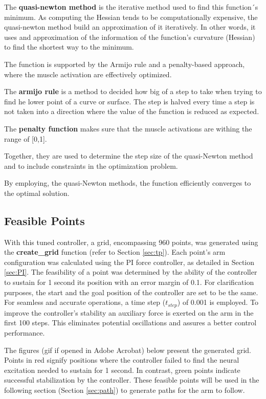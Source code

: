 The \textbf{quasi-newton method} is the iterative method used to find this function´s minimum. As computing the Hessian tends to be computationally expensive, the quasi-newton method build an approximation of it iteratively. In other words, it uses and approximation of the information of the function's curvature (Hessian) to find the shortest way to the minimum. 

The function is supported by the Armijo rule and a penalty-based approach, where the muscle activation are effectively optimized. 

The \textbf{armijo rule }is a method to decided how big of a step to take when trying to find he lower point of a curve or surface. 
The step is halved every time a step is not taken into a direction where the value of the function is reduced as expected. 

The \textbf{penalty function} makes sure that the muscle activations are withing the range of [0,1]. 

Together, they are used to determine the step size of the quasi-Newton method and to include constraints in the optimization problem. 

By employing, the quasi-Newton methods, the function efficiently converges to the optimal solution.             

\subsection{Feasible Points}
With this tuned controller, a grid, encompassing 960 points, was generated using the \textbf{create\_grid} function (refer to Section \ref{sec:tp}). Each point's arm configuration was calculated using the PI force controller, as detailed in Section \ref{sec:PI}. The feasibility of a point was determined by the ability of the controller to sustain for 1 second its position with an error margin of 0.1. For clarification purposes, the start and the goal position of the controller are set to be the same. 
For seamless and accurate operations, a time step (\(t_{step}\)) of 0.001 is employed. To improve the controller's stability an auxiliary force is exerted on the arm in the first 100 steps. This eliminates potential oscillations and assures a better control performance.

The figures (gif if opened in Adobe Acrobat) below present the generated grid. Points in red signify positions where the controller failed to find the neural excitation needed to sustain for 1 second. In contrast, green points indicate successful stabilization by the controller. These feasible points will be used in the following section (Section \ref{sec:path}) to generate paths for the arm to follow. 


